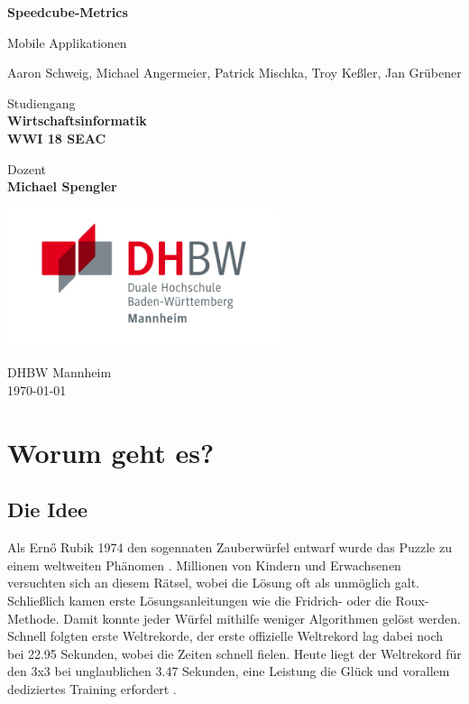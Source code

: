 \documentclass[a4paper]{article}
\theoremstyle{definition}
\begin{document}
\begin{titlepage}
	\begin{center}

		\Huge
		\textbf{Speedcube-Metrics}

		\vspace{0.5cm}
		\LARGE
		Mobile Applikationen

		\vspace{1.5cm}
		Aaron Schweig, Michael Angermeier, Patrick Mischka,
		Troy Keßler, Jan Grübener

		\vfill

		Studiengang\\
		\textbf{Wirtschaftsinformatik\\ WWI 18 SEAC}

		\vspace{0.8cm}

		Dozent\\
		\textbf{Michael Spengler}

		\vspace{0.8cm}

		\vspace{0.8cm}

		\includegraphics[width=0.6\textwidth]{img/dhbw.jpg}

		\Large
		DHBW Mannheim\\
		\today

	\end{center}
\end{titlepage}

\section{Worum geht es?}
\subsection{Die Idee}
Als Ernő Rubik 1974 den sogennaten Zauberwürfel entwarf wurde das Puzzle zu einem weltweiten Phänomen \cite{ernorubik}.
Millionen von Kindern und Erwachsenen versuchten sich an diesem Rätsel, wobei die Lösung oft als unmöglich
galt. Schließlich kamen erste Lösungsanleitungen wie die Fridrich- oder die Roux-Methode. Damit konnte jeder Würfel
mithilfe weniger Algorithmen gelöst werden. Schnell folgten erste Weltrekorde, der erste offizielle
Weltrekord lag dabei noch bei 22.95 Sekunden, wobei die Zeiten schnell fielen. Heute liegt der Weltrekord für den
3x3 bei unglaublichen 3.47 Sekunden, eine Leistung die Glück und vorallem dediziertes Training erfordert \cite{worldcubeassociation}.
\end{document}

